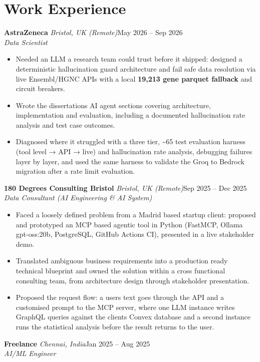 \documentclass[a4paper,11pt]{article}
\newcommand{\role}[4]{%
  \textbf{#1}{\color{muted}\,\textperiodcentered\,\textit{#2}}\hfill{\color{muted}#3}\\
  \textit{#4}\par}
\newcommand{\gap}{\vspace{5pt}}
\newcommand{\num}[1]{\textbf{#1}}   %
\begin{document}
\section{Work Experience}
\role{AstraZeneca}{Bristol, UK (Remote)}{May 2026 – Sep 2026}{Data Scientist}
\begin{itemize}
  \item Needed an LLM a research team could trust before it shipped: designed a deterministic hallucination guard architecture and fail safe data resolution via live Ensembl/HGNC APIs with a local \num{19,213 gene parquet fallback} and circuit breakers.
  \item Wrote the dissertation\textquotesingle{}s AI agent sections covering architecture, implementation and evaluation, including a documented hallucination rate analysis and test case outcomes.
  \item Diagnosed where it struggled with a three tier, \textasciitilde{}65 test evaluation harness (tool level → API → live) and hallucination rate analysis, debugging failures layer by layer, and used the same harness to validate the Groq to Bedrock migration after a rate limit evaluation.
\end{itemize}
\gap
{}
\role{180 Degrees Consulting Bristol}{Bristol, UK (Remote)}{Sep 2025 – Dec 2025}{Data Consultant (AI Engineering \& AI System)}
\begin{itemize}
  \item Faced a loosely defined problem from a Madrid based startup client: proposed and prototyped an MCP based agentic tool in Python (FastMCP, Ollama gpt-oss:20b, PostgreSQL, GitHub Actions CI), presented in a live stakeholder demo.
  \item Translated ambiguous business requirements into a production ready technical blueprint and owned the solution within a cross functional consulting team, from architecture design through stakeholder presentation.
  \item Proposed the request flow: a user\textquotesingle{}s text goes through the API and a customised prompt to the MCP server, where one LLM instance writes GraphQL queries against the client\textquotesingle{}s Convex database and a second instance runs the statistical analysis before the result returns to the user.
\end{itemize}
\gap
{}
\role{Freelance}{Chennai, India}{Jan 2025 – Aug 2025}{AI/ML Engineer}
\end{document}
